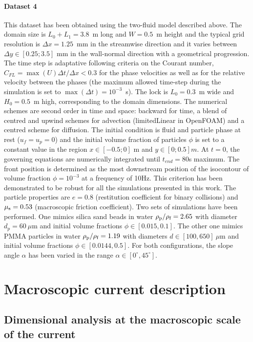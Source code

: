 \documentclass[12pt]{article}
\begin{document}
\paragraph{Dataset 4}

This dataset has been obtained using the two-fluid model described above. The domain size is $L_0+L_1=3.8$~m long and $W=0.5$~m height and the typical grid resolution is $\Delta x=1.25$~mm in the streamwise direction and it varies between $\Delta y \in [0.25 ; 3.5]$ mm in the wall-normal direction with a geometrical progression. The time step is adaptative following criteria on the Courant number, $C_{FL}=\max(U) \Delta t / \Delta x < 0.3$ for the phase velocities as well as for the relative velocity between the phases (the maximum allowed time-step during the simulation is set to $\max(\Delta t) = 10^{-3}$~s). The lock is $L_0=0.3$~m wide and $H_0=0.5$~m high, corresponding to the domain dimensions. The numerical schemes are second order in time and space: backward for time, a blend of centred and upwind schemes for advection (limitedLinear in OpenFOAM) and a centred scheme for diffusion. The initial condition is fluid and particle phase at rest ($u_f=u_p=0$) and the initial volume fraction of particles $\phi$ is set to a constant value in the region $x\in[-0.5 ; 0]$ m and $y\in[0;0.5]m$. At $t=0$, the governing equations are numerically integrated until $t_{end}=80$s maximum. The front position is determined as the most downstream position of the isocontour of volume fraction $\phi =10^{-3}$ at a frequency of 10Hz. This criterion has been demonstrated to be robust for all the simulations presented in this work. The particle properties are $e=0.8$ (restitution coefficient for binary collisions) and $\mu_{\text s}=0.53$ (macroscopic friction coefficient). Two sets of simulations have been performed. One mimics silica sand beads in water $\rho_{\text p}/\rho_{\text f}=2.65$ with diameter $d_p=60~\mu$m and initial volume fractions $\phi\in[0.015, 0.1]$. The other one mimics PMMA particles in water $\rho_{\text p}/\rho_{\text f}=1.19$ with diameters $d \in [100, 650]~\mu$m and initial volume fractions $\phi \in [0.0144, 0.5]$. For both configurations, the slope angle $\alpha$ has been varied in the range $\alpha \in [0^\circ, 45^\circ]$.

\section{Macroscopic current description}
\label{sec:current_description}
\subsection{Dimensional analysis at the macroscopic scale of the current}
\label{sec:dimensionlessmap}
\end{document}
